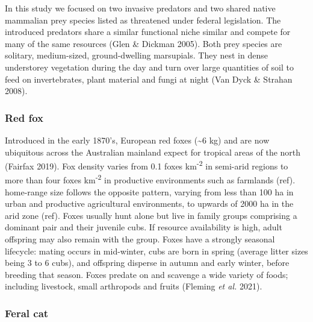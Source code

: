 \documentclass[11pt,a4paper,titlepage,twoside,openright]{style/unimelbthesis}
\begin{document}
\begin{mainmatter}
In this study we focused on two invasive predators and two shared native mammalian prey species listed as threatened under federal legislation. The introduced predators share a similar functional niche similar and compete for many of the same resources (Glen \& Dickman 2005). Both prey species are solitary, medium-sized, ground-dwelling marsupials. They nest in dense understorey vegetation during the day and turn over large quantities of soil to feed on invertebrates, plant material and fungi at night (Van Dyck \& Strahan 2008).

\hypertarget{red-fox}{%
\subsubsection{Red fox}\label{red-fox}}

Introduced in the early 1870's, European red foxes (\textasciitilde6 kg) and are now ubiquitous across the Australian mainland expect for tropical areas of the north (Fairfax 2019). Fox density varies from 0.1 foxes km\textsuperscript{-2} in semi-arid regions to more than four foxes km\textsuperscript{-2} in productive environments such as farmlands (ref). home-range size follows the opposite pattern, varying from less than 100 ha in urban and productive agricultural environments, to upwards of 2000 ha in the arid zone (ref). Foxes usually hunt alone but live in family groups comprising a dominant pair and their juvenile cubs. If resource availability is high, adult offspring may also remain with the group. Foxes have a strongly seasonal lifecycle: mating occurs in mid-winter, cubs are born in spring (average litter sizes being 3 to 6 cubs), and offspring disperse in autumn and early winter, before breeding that season. Foxes predate on and scavenge a wide variety of foods; including livestock, small arthropods and fruits (Fleming \emph{et al.} 2021).

\hypertarget{feral-cat}{%
\subsubsection{Feral cat}\label{feral-cat}}


\end{mainmatter}
\end{document}

